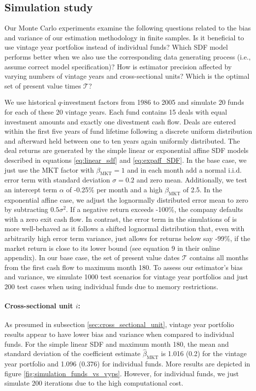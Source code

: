 \documentclass[12pt]{article}
\begin{document}
\subsection{Simulation study}
\label{sec:simulation_study}

Our Monte Carlo experiments examine the following questions related to the bias and variance of our estimation methodology in finite samples.
Is it beneficial to use vintage year portfolios instead of individual funds?
Which SDF model performs better when we also use the corresponding data generating process (i.e., assume correct model specification)?
How is estimator precision affected by varying numbers of vintage years and cross-sectional units?
Which is the optimal set of present value times $\mathcal{T}$?


We use historical $q$-investment factors from 1986 to 2005 and simulate 20 funds for each of these 20 vintage years.
Each fund contains 15 deals with equal investment amounts and exactly one divestment cash flow.
Deals are entered within the first five years of fund lifetime following a discrete uniform distribution and afterward held between one to ten years again uniformly distributed.
The deal returns are generated by the simple linear or exponential affine SDF models described in equations \ref{eq:linear_sdf} and \ref{eq:expaff_SDF}.
In the base case, we just use the MKT factor with $\beta_{\mathrm{MKT}}=1$ and in each month add a normal i.i.d. error term with standard deviation $\sigma=0.2$ and zero mean.
Additionally, we test an intercept term $\alpha$ of -0.25\% per month and a high $\beta_{\mathrm{MKT}}$ of 2.5.
In the exponential affine case, we adjust the lognormally distributed error mean to zero by subtracting $0.5 \sigma^2$.
If a negative return exceeds -100\%, the company defaults with a zero exit cash flow.
In contrast, the error term in the simulations of \cite{DLP12} is more well-behaved as it follows a shifted lognormal distribution that, even with arbitrarily high error term variance, just allows for returns below say -99\%, if the market return is close to its lower bound (see equation 9 in their online appendix).
In our base case, the set of present value dates $\mathcal{T}$ contains all months from the first cash flow to maximum month 180.
To assess our estimator's bias and variance, we simulate 1000 test scenarios for vintage year portfolios and just 200 test cases when using individual funds due to memory restrictions.


\paragraph{Cross-sectional unit $i$:}
As presumed in subsection \ref{sec:cross_sectional_unit}, vintage year portfolio results appear to have lower bias and variance when compared to individual funds.
For the simple linear SDF and maximum month 180, the mean and standard deviation of the coefficient estimate $\hat{\beta}_{\mathrm{MKT}}$ is 1.016 (0.2) for the vintage year portfolio and 1.096 (0.376) for individual funds. 
More results are depicted in figure \ref{fig:simulation_funds_vs_vyps}.
However, for individual funds, we just simulate 200 iterations due to the high computational cost.
\end{document}
